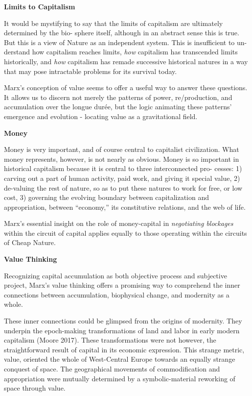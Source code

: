 \documentclass[
]{book}
\begin{document}
\textbf{Limits to Capitalism}

It would be mystifying to say
that the limits of capitalism are ultimately determined by the bio-
sphere itself, although in an abstract sense this is true. But this is a
view of Nature as an independent system. This is insufficient to un-
derstand how capitalism reaches limits, \emph{how} capitalism has transcended
limits historically, and \emph{how} capitalism has remade successive
historical natures in a way that may pose intractable problems for its
survival today.

Marx's conception of value seems to offer a useful way to answer
these questions. It allows us to discern not merely the patterns of
power, re/production, and accumulation over the longue durée, but
the logic animating these patterns' emergence and evolution
- locating value as a gravitational field.

\textbf{Money}

Money is very important, and of course central to capitalist civilization. What money
represents, however, is not nearly as obvious. Money is so important in
historical capitalism because it is central to three interconnected pro-
cesses: 1) carving out a part of human activity, paid work, and giving
it special value, 2) de-valuing the rest of nature, so as to put these
natures to work for free, or low cost, 3) governing the evolving
boundary between capitalization and appropriation, between ``economy,''
its constitutive relations, and the web of life.

Marx's essential insight on
the role of money-capital in \emph{negotiating blockages} within the circuit
of capital applies equally to those operating within the circuits of
Cheap Nature.

\textbf{Value Thinking}

Recognizing capital accumulation as both objective process and
subjective project, Marx's value thinking offers a promising way to
comprehend the inner connections between accumulation, biophysical
change, and modernity as a whole.

These inner connections
could be glimpsed from the origins of modernity. They underpin the
epoch-making transformations of land and labor in early modern
capitalism (Moore 2017). These transformations were not however,
the straightforward result of capital in its economic expression. This
strange metric, value, oriented the whole of West-Central Europe
towards an equally strange conquest of space. The geographical
movements of commodification and appropriation were mutually
determined by a symbolic-material reworking of space through value.
\end{document}
